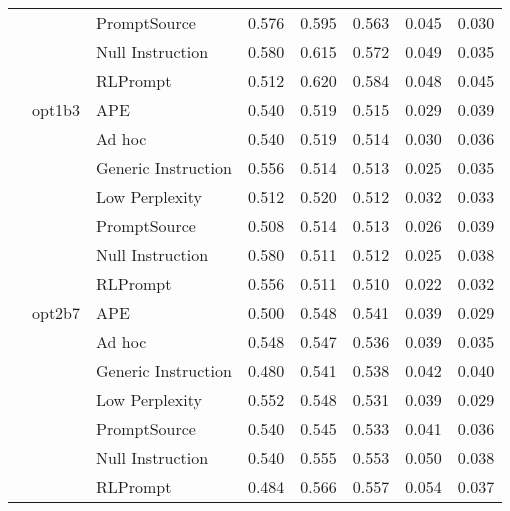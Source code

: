 \begin{supertabular}{lllrrrrr}
              &        & PromptSource &            0.576 &           0.595 &          0.563 &        0.045 &    0.030 \\
              &        & Null Instruction &            0.580 &           0.615 &          0.572 &        0.049 &    0.035 \\
              &        & RLPrompt &            0.512 &           0.620 &          0.584 &        0.048 &    0.045 \\
              & opt1b3 & APE &            0.540 &           0.519 &          0.515 &        0.029 &    0.039 \\
              &        & Ad hoc &            0.540 &           0.519 &          0.514 &        0.030 &    0.036 \\
              &        & Generic Instruction &            0.556 &           0.514 &          0.513 &        0.025 &    0.035 \\
              &        & Low Perplexity &            0.512 &           0.520 &          0.512 &        0.032 &    0.033 \\
              &        & PromptSource &            0.508 &           0.514 &          0.513 &        0.026 &    0.039 \\
              &        & Null Instruction &            0.580 &           0.511 &          0.512 &        0.025 &    0.038 \\
              &        & RLPrompt &            0.556 &           0.511 &          0.510 &        0.022 &    0.032 \\
              & opt2b7 & APE &            0.500 &           0.548 &          0.541 &        0.039 &    0.029 \\
              &        & Ad hoc &            0.548 &           0.547 &          0.536 &        0.039 &    0.035 \\
              &        & Generic Instruction &            0.480 &           0.541 &          0.538 &        0.042 &    0.040 \\
              &        & Low Perplexity &            0.552 &           0.548 &          0.531 &        0.039 &    0.029 \\
              &        & PromptSource &            0.540 &           0.545 &          0.533 &        0.041 &    0.036 \\
              &        & Null Instruction &            0.540 &           0.555 &          0.553 &        0.050 &    0.038 \\
              &        & RLPrompt &            0.484 &           0.566 &          0.557 &        0.054 &    0.037 \\

\end{supertabular}
